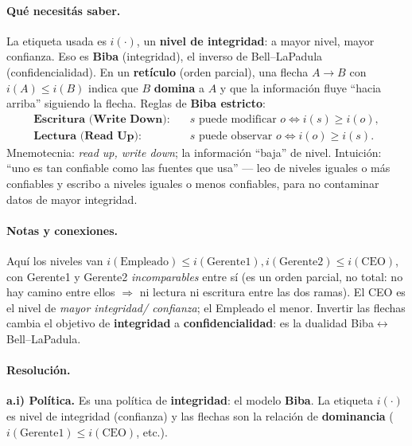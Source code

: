 \paragraph{Qué necesitás saber.} La etiqueta usada es $i(\cdot)$, un \textbf{nivel de
integridad}: a mayor nivel, mayor confianza. Eso es \textbf{Biba} (integridad), el inverso de
Bell--LaPadula (confidencialidad). En un \textbf{retículo} (orden parcial), una flecha
$A \to B$ con $i(A)\le i(B)$ indica que $B$ \textbf{domina} a $A$ y que la información fluye
``hacia arriba'' siguiendo la flecha. Reglas de \textbf{Biba estricto}:
\begin{align*}
  \textbf{Escritura (Write Down):}\quad & s \text{ puede modificar } o \iff i(s) \ge i(o), \\
  \textbf{Lectura (Read Up):}\quad      & s \text{ puede observar } o \iff i(o) \ge i(s).
\end{align*}
Mnemotecnia: \emph{read up, write down}; la información ``baja'' de nivel. Intuición: ``uno es
tan confiable como las fuentes que usa'' — leo de niveles iguales o más confiables y escribo a
niveles iguales o menos confiables, para no contaminar datos de mayor integridad.

\paragraph{Notas y conexiones.} Aquí los niveles van $i(\text{Empleado}) \le
i(\text{Gerente1}), i(\text{Gerente2}) \le i(\text{CEO})$, con Gerente1 y Gerente2
\emph{incomparables} entre sí (es un orden parcial, no total: no hay camino entre ellos $\Rightarrow$
ni lectura ni escritura entre las dos ramas). El CEO es el nivel de \emph{mayor integridad/
confianza}; el Empleado el menor. Invertir las flechas cambia el objetivo de \textbf{integridad}
a \textbf{confidencialidad}: es la dualidad Biba$\leftrightarrow$Bell--LaPadula.

\paragraph{Resolución.}
\textbf{a.i) Política.} Es una política de \textbf{integridad}: el modelo \textbf{Biba}. La
etiqueta $i(\cdot)$ es nivel de integridad (confianza) y las flechas son la relación de
\textbf{dominancia} ($i(\text{Gerente1})\le i(\text{CEO})$, etc.).

